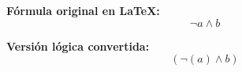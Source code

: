 \documentclass{article}
\begin{document}
\textbf{Fórmula original en LaTeX:}
\[
\lnot a \land b 
\]

\textbf{Versión lógica convertida:}
\[
( \lnot ( a ) \land b )
\]
\end{document}
